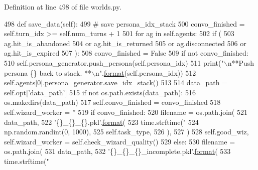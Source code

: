Definition at line 498 of file worlds.\+py.


\begin{DoxyCode}
498     \textcolor{keyword}{def }save\_data(self):
499         \textcolor{comment}{# save persona\_idx\_stack}
500         convo\_finished = self.turn\_idx >= self.num\_turns + 1
501         \textcolor{keywordflow}{for} ag \textcolor{keywordflow}{in} self.agents:
502             \textcolor{keywordflow}{if} (
503                 ag.hit\_is\_abandoned
504                 \textcolor{keywordflow}{or} ag.hit\_is\_returned
505                 \textcolor{keywordflow}{or} ag.disconnected
506                 \textcolor{keywordflow}{or} ag.hit\_is\_expired
507             ):
508                 convo\_finished = \textcolor{keyword}{False}
509         \textcolor{keywordflow}{if} \textcolor{keywordflow}{not} convo\_finished:
510             self.persona\_generator.push\_persona(self.persona\_idx)
511             print(\textcolor{stringliteral}{"\(\backslash\)n**Push persona \{\} back to stack. **\(\backslash\)n"}.\hyperlink{namespaceparlai_1_1chat__service_1_1services_1_1messenger_1_1shared__utils_a32e2e2022b824fbaf80c747160b52a76}{format}(self.persona\_idx))
512         self.agents[0].persona\_generator.save\_idx\_stack()
513 
514         data\_path = self.opt[\textcolor{stringliteral}{'data\_path'}]
515         \textcolor{keywordflow}{if} \textcolor{keywordflow}{not} os.path.exists(data\_path):
516             os.makedirs(data\_path)
517         self.convo\_finished = convo\_finished
518         self.wizard\_worker = \textcolor{stringliteral}{''}
519         \textcolor{keywordflow}{if} convo\_finished:
520             filename = os.path.join(
521                 data\_path,
522                 \textcolor{stringliteral}{'\{\}\_\{\}\_\{\}.pkl'}.\hyperlink{namespaceparlai_1_1chat__service_1_1services_1_1messenger_1_1shared__utils_a32e2e2022b824fbaf80c747160b52a76}{format}(
523                     time.strftime(\textcolor{stringliteral}{"%
524                     np.random.randint(0, 1000),
525                     self.task\_type,
526                 ),
527             )
528             self.good\_wiz, self.wizard\_worker = self.check\_wizard\_quality()
529         \textcolor{keywordflow}{else}:
530             filename = os.path.join(
531                 data\_path,
532                 \textcolor{stringliteral}{'\{\}\_\{\}\_\{\}\_incomplete.pkl'}.\hyperlink{namespaceparlai_1_1chat__service_1_1services_1_1messenger_1_1shared__utils_a32e2e2022b824fbaf80c747160b52a76}{format}(
533                     time.strftime(\textcolor{stringliteral}{"%
}}
\end{DoxyCode}
